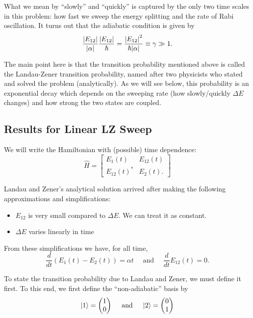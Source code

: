 \documentclass{book}
\theoremstyle{definition}
\newcommand{\al}{\alpha}
\newcommand{\f}[2]{\frac{#1}{#2}}
\begin{document}
What we mean by ``slowly'' and ``quickly'' is captured by the only two time scales in this problem: how fast we sweep the energy splitting and the rate of Rabi oscillation. It turns out that the adiabatic condition is given by 
\begin{equation*}
\f{\abs{E_{12}}}{\abs{\al}} \f{\abs{E_{12}}}{\hbar} = \f{\abs{E_{12}}^2}{\hbar\abs{\al}} \equiv \gamma  \gg 1.
\end{equation*}

The main point here is that the transition probability mentioned above is called the Landau-Zener transition probability, named after two physicists who stated and solved the problem (analytically). As we will see below, this probability is an exponential decay which depends on the sweeping rate (how slowly/quickly $\Delta E$ changes) and how strong the two states are coupled. 

\subsection*{Results for Linear LZ Sweep}

We will write the Hamiltonian with (possible) time dependence:
\begin{equation*}
\widehat{H} = \begin{bmatrix}
E_1(t) & E_{12}(t) \\ E_{12}(t)^* & E_{2}(t).
\end{bmatrix}
\end{equation*}



Landau and Zener's analytical solution arrived after making the following approximations and simplifications: 
\begin{itemize}
	\item $E_{12}$ is very small compared to $\Delta E$. We can treat it as constant.
	\item $\Delta E$ varies linearly in time 
\end{itemize}

From these simplifications we have, for all time, 
\begin{equation*}
\f{d}{dt}(E_1(t) - E_2(t)) = \al t \quad \text{ and } \quad \f{d}{dt}{E_{12}(t)} = 0.
\end{equation*}

To state the transition probability due to Landau and Zener, we must define it first. To this end, we first define the ``non-adiabatic'' basis by 
\begin{equation*}
\ket{1} = \begin{pmatrix}
1 \\ 0
\end{pmatrix} \quad \text{ and }  \quad
\ket{2} = \begin{pmatrix}
0 \\ 1
\end{pmatrix}
\end{equation*}
\end{document}
